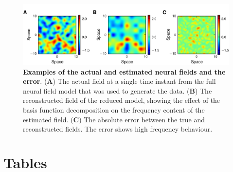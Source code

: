 \documentclass[10pt]{article}
\begin{document}
\begin{figure}[!ht]
\begin{center}
\includegraphics{./Graph/pdf/Figure10.pdf}
\end{center}
\caption{{\bf Examples of the actual and estimated neural fields and the error}. (\textbf{A}) The actual field at a single time instant from the full neural field model that was used to generate the data. (\textbf{B}) The reconstructed field of the reduced model, showing the effect of the basis function decomposition on the frequency content of the estimated field. (\textbf{C}) The absolute error between the true and reconstructed fields. The error shows high frequency behaviour.}
\label{fig:FieldEstimate}
\end{figure}

\section*{Tables}
\end{document}
